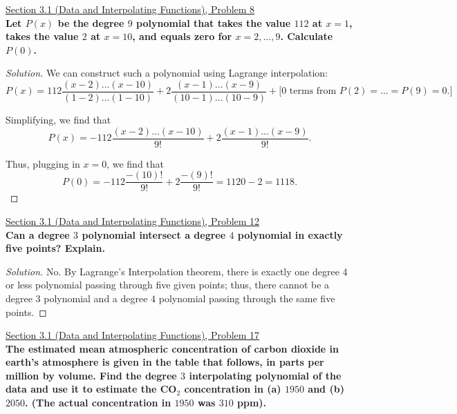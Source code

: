 \documentclass[11pt]{article}
\newenvironment{solution}
  {\renewcommand\qedsymbol{$\blacksquare$}\begin{proof}[Solution]}
  {\end{proof}}
\theoremstyle{definition}
\begin{document}
\newpage

\underline{Section 3.1 (Data and Interpolating Functions), Problem 8} \\

\textbf{Let $P(x)$ be the degree $9$ polynomial that takes the value $112$ at $x = 1$, takes the value $2$ at $x = 10$, and equals zero for $x = 2, \dots,9$. Calculate $P(0)$.}

\begin{solution}
    We can construct such a polynomial using Lagrange interpolation:
    \[ P(x) = 112 \frac{(x-2)\dots(x-10)}{(1-2)\dots(1-10)} + 2\frac{(x-1)\dots(x-9)}{(10-1)\dots(10-9)} + \text{[0 terms from } P(2) = \dots = P(9) = 0.\text{]} \]

    Simplifying, we find that \[P(x) = -112 \frac{(x-2)\dots(x-10)}{9!} + 2\frac{(x-1)\dots(x-9)}{9!}.\]

    Thus, plugging in $x=0$, we find that \[ P(0) = -112\frac{-(10)!}{9!} + 2\frac{-(9)!}{9!} = 1120 - 2 = \boxed{1118}.\]


\end{solution}

\vspace{1cm}

\underline{Section 3.1 (Data and Interpolating Functions), Problem 12} \\

\textbf{Can a degree $3$ polynomial intersect a degree $4$ polynomial in exactly five points? Explain.}

\begin{solution}
No. By Lagrange's Interpolation theorem, there is exactly one degree $4$ or less polynomial passing through five given points; thus, there cannot be a degree $3$ polynomial and a degree $4$ polynomial passing through the same five points.    
\end{solution}

\vspace{1cm}

\underline{Section 3.1 (Data and Interpolating Functions), Problem 17} \\

\textbf{The estimated mean atmospheric concentration of carbon dioxide in earth's atmosphere is given in the table that follows, 
in parts per million by volume. Find the degree $3$ interpolating polynomial of the data and use it to estimate the CO$_2$ concentration in
(a) $1950$ and (b) $2050$. (The actual concentration in $1950$ was $310$ ppm).} 
\end{document}
